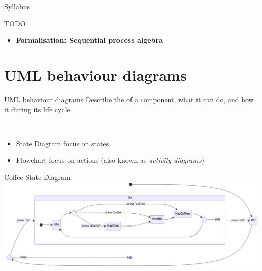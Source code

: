 \documentclass[aspectratio=169]{beamer}
\begin{document}


\begin{slide}{Syllabus}
  \begin{block}{}
    TODO
  \end{block}
  \begin{itemize}
    \item {\Large \textbf{\alert{Formalisation: Sequential process algebra}}}
  \end{itemize}
\end{slide}


\section{UML behaviour diagrams}

\begin{slide}{UML behaviour diagrams}
  Describe the  of a component, what  it can do, and how it  during its life cycle.

  ~\\[5mm]

  \begin{itemize}
    \item \alert{State Diagram} focus on states
    \item \alert{Flowchart} focus on actions (also known as \emph{activity diagrams})
  \end{itemize}
\end{slide}


\begin{slide}{Coffee State Diagram}
    \includegraphics[width=1.0\textwidth]{images/diagrams/coffee-state.png}
\end{slide}
\end{document}
